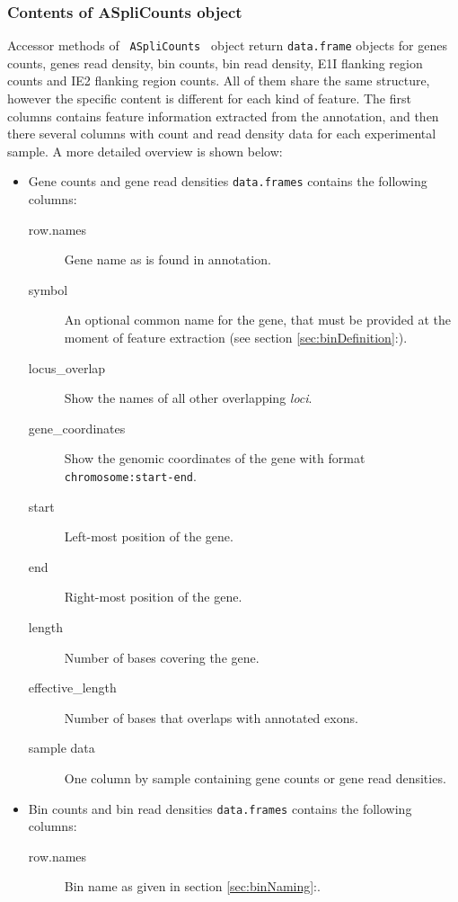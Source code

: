 \documentclass{article}
\begin{document}
\subsubsection{ Contents of ASpliCounts object }
Accessor methods of \texttt{ ASpliCounts } object return \texttt{data.frame}
objects for genes counts, genes read density, bin counts, bin read density, E1I
flanking region counts and IE2 flanking region counts. All of them share the
same structure, however the specific content is different for each kind of 
feature. The first columns contains feature information extracted from the
annotation, and then there several columns with count and read density data for
each experimental sample. A more detailed overview is shown below:

\begin{itemize}
  \item Gene counts and gene read densities \texttt{data.frames} contains the
  following columns:
    \begin{description}
      \item[row.names] Gene name as is found in annotation.
      \item[symbol] An optional common name for the gene, that must be provided at
      the moment of feature extraction (see section \ref{sec:binDefinition}:).
      \item[locus\_overlap] Show the names of all other overlapping \textit{loci}.
      \item[gene\_coordinates] Show the genomic coordinates of the gene with
      format \texttt{chromosome:start-end}.
      \item[start] Left-most position of the gene.
      \item[end] Right-most position of the gene.
      \item[length] Number of bases covering the gene.
      \item[effective\_length] Number of bases that overlaps with annotated exons.
      \item[sample data] One column by sample containing gene counts or gene read
      densities.
      \\
    \end{description} 
  \item Bin counts and bin read densities \texttt{data.frames} contains the
  following columns:
    \begin{description}
      \item[row.names] Bin name as given in section \ref{sec:binNaming}:.

\end{description}
\end{itemize}
\end{document}
